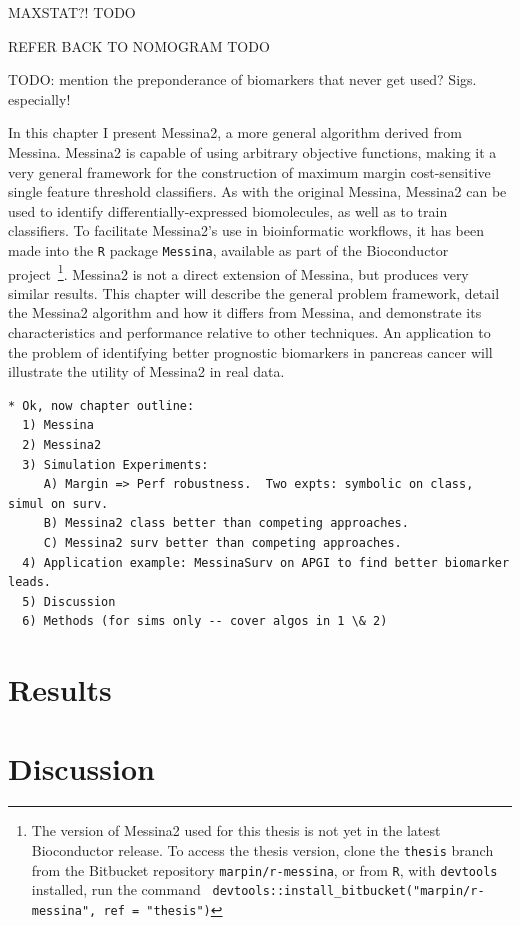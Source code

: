 \documentclass[dissertation.tex]{subfiles}
\begin{document}
MAXSTAT?! TODO

REFER BACK TO NOMOGRAM TODO

TODO: mention the preponderance of biomarkers that never get used?  Sigs. especially!

In this chapter I present Messina2, a more general algorithm derived from Messina.  Messina2 is capable of using arbitrary objective functions, making it a very general framework for the construction of maximum margin cost-sensitive single feature threshold classifiers.  As with the original Messina, Messina2 can be used to identify differentially-expressed biomolecules, as well as to train classifiers.  To facilitate Messina2's use in bioinformatic workflows, it has been made into the \texttt{R} package \texttt{Messina}, available as part of the Bioconductor project~\cite{Gentleman2004}\footnote{The version of Messina2 used for this thesis is not yet in the latest Bioconductor release.  To access the thesis version, clone the \texttt{thesis} branch from the Bitbucket repository \texttt{marpin/r-messina}, or from \texttt{R}, with \texttt{devtools} installed, run the command \texttt{ devtools::install_bitbucket("marpin/r-messina", ref = "thesis")}}.  Messina2 is not a direct extension of Messina, but produces very similar results.  This chapter will describe the general problem framework, detail the Messina2 algorithm and how it differs from Messina, and demonstrate its characteristics and performance relative to other techniques.  An application to the problem of identifying better prognostic biomarkers in pancreas cancer will illustrate the utility of Messina2 in real data.

\begin{verbatim}
* Ok, now chapter outline:
  1) Messina
  2) Messina2
  3) Simulation Experiments:
     A) Margin => Perf robustness.  Two expts: symbolic on class, simul on surv.
     B) Messina2 class better than competing approaches.
     C) Messina2 surv better than competing approaches.
  4) Application example: MessinaSurv on APGI to find better biomarker leads.
  5) Discussion
  6) Methods (for sims only -- cover algos in 1 \& 2)
\end{verbatim}



\section{Results}

\section{Discussion}
\end{document}
